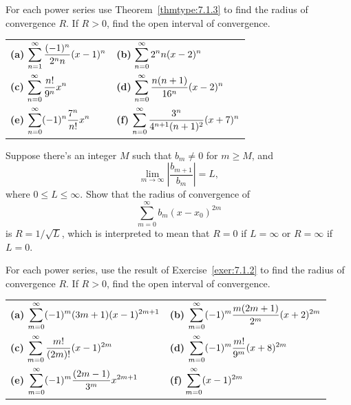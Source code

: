 \exercises
\begin{exerciselist}
  \item\label{exer:7.1.1} For each power series use Theorem~\ref{thmtype:7.1.3} to find the radius
        of convergence $R$. If $R>0$, find the open interval of convergence.

  \begin{tabular}[t]{@{}p{168pt}@{}p{168pt}}
    {\bf (a)} $\displaystyle{\sum_{n=1}^{\infty}\frac{(-1)^{n}}{2^{n}n}(x-1)^{n}}$ & {\bf (b)} $\displaystyle{\sum_{n=0}^{\infty}2^{n}n(x-2)^{n}}$                         \\
    {\bf (c)} $\displaystyle{\sum_{n=0}^{\infty}\frac{n!}{9^{n}}x^{n}}$            & {\bf (d)} $\displaystyle{\sum_{n=0}^{\infty}\frac{n(n+1)}{16^{n}}(x-2)^{n}}$          \\
    {\bf (e)} $\displaystyle{\sum_{n=0}^{\infty}(-1)^{n}\frac{7^{n}}{n!}x^{n}}$    & {\bf (f)} $\displaystyle{\sum_{n=0}^{\infty}\frac{3^{n}}{4^{n+1}(n+1)^{2}}(x+7)^{n}}$
  \end{tabular}

  \item\label{exer:7.1.2} Suppose there's an integer $M$ such that $b_{m}\ne0$ for $m\ge M$, and
  \[
    \lim_{m\to\infty}\left|\frac{b_{m+1}}{b_{m}}\right|=L,
  \]
  where $0\le L\le\infty$. Show that the radius of convergence of
  \[
    \sum_{m=0}^{\infty}b_{m}(x-x_{0})^{2m}
  \]
  is $R=1/\sqrt{L}$, which is interpreted to mean that $R=0$ if $L=\infty$ or $R=\infty$ if $L=0$.

  \item\label{exer:7.1.3} For each power series, use the result of Exercise~\ref{exer:7.1.2} to find
        the radius of convergence $R$. If $R>0$, find the open interval of convergence.

  \begin{tabular}[t]{@{}p{168pt}@{}p{168pt}}
    {\bf (a)} $\displaystyle{\sum_{m=0}^{\infty}(-1)^{m}(3m+1)(x-1)^{2m+1}}$           & {\bf (b)} $\displaystyle{\sum_{m=0}^{\infty} (-1)^{m}\frac{m(2m+1)}{2^{m}}(x+2)^{2m}}$ \\
    {\bf (c)} $\displaystyle{\sum_{m=0}^{\infty}\frac{m!}{(2m)!}(x-1)^{2m}}$           & {\bf (d)} $\displaystyle{\sum_{m=0}^{\infty}(-1)^{m}\frac{m!}{9^{m}}(x+8)^{2m}}$       \\
    {\bf (e)} $\displaystyle{\sum_{m=0}^{\infty}(-1)^{m}\frac{(2m-1)}{3^{m}}x^{2m+1}}$ & {\bf (f)} $\displaystyle{\sum_{m=0}^{\infty}(x-1)^{2m}}$
  \end{tabular}


\end{exerciselist}

